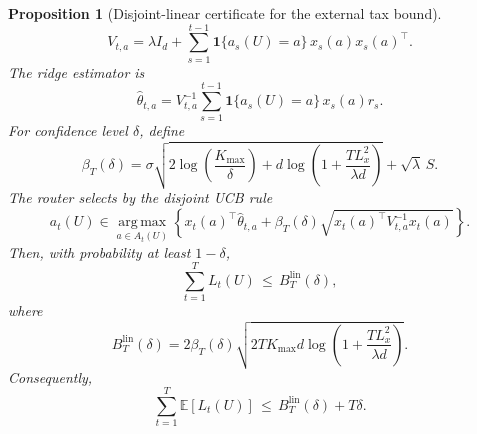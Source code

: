 \documentclass{article} %
\newtheorem{proposition}[theorem]{Proposition}
\begin{document}
\begin{proposition}[Disjoint-linear certificate for the external tax bound]
\begin{equation}
\label{eq:app-ridge-matrix}
V_{t,a}
=
\lambda I_d
+
\sum_{s=1}^{t-1}
\mathbf{1}\{a_s(U)=a\}\,x_s(a)x_s(a)^\top.
\end{equation}
The ridge estimator is
\begin{equation}
\label{eq:app-ridge-estimator}
\widehat{\theta}_{t,a}
=
V_{t,a}^{-1}
\sum_{s=1}^{t-1}
\mathbf{1}\{a_s(U)=a\}\,x_s(a)r_s.
\end{equation}
For confidence level \(\delta\), define
\begin{equation}
\label{eq:app-beta}
\beta_T(\delta)
=
\sigma
\sqrt{
2\log\!\left(\frac{K_{\max}}{\delta}\right)
+
d\log\!\left(1+\frac{T L_x^2}{\lambda d}\right)
}
+
\sqrt{\lambda}\,S.
\end{equation}
The router selects by the disjoint UCB rule
\begin{equation}
\label{eq:app-ucb-rule}
a_t(U)
\in
\operatorname*{arg\,max}_{a\in A_t(U)}
\left\{
x_t(a)^\top\widehat{\theta}_{t,a}
+
\beta_T(\delta)
\sqrt{x_t(a)^\top V_{t,a}^{-1}x_t(a)}
\right\}.
\end{equation}
Then, with probability at least \(1-\delta\),
\begin{equation}
\label{eq:app-lin-highprob-tax}
\sum_{t=1}^{T}L_t(U)
\,\le\,
B_T^{\mathrm{lin}}(\delta),
\end{equation}
where
\begin{equation}
\label{eq:app-lin-bt}
B_T^{\mathrm{lin}}(\delta)
=
2\beta_T(\delta)
\sqrt{
2T K_{\max} d
\log\!\left(1+\frac{T L_x^2}{\lambda d}\right)
}.
\end{equation}
Consequently,
\begin{equation}
\label{eq:app-lin-expected-tax}
\sum_{t=1}^{T}\mathbb{E}[L_t(U)]
\,\le\,
B_T^{\mathrm{lin}}(\delta)+T\delta.
\end{equation}
\end{proposition}
\end{document}
